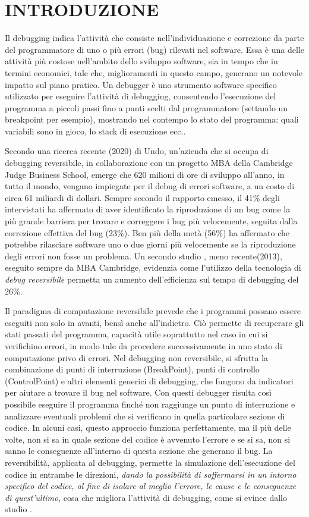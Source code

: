 \documentclass[Tesi.tex]{subfiles}
\begin{document}
\section{INTRODUZIONE}
Il debugging indica l'attività che consiste nell'individuazione e correzione da parte del programmatore di uno o più errori (bug) rilevati nel software.
Essa è una delle attività più costose nell’ambito dello sviluppo software, sia in tempo che in termini economici, tale che, miglioramenti in questo campo, generano un notevole impatto sul piano pratico.
Un debugger è uno strumento software specifico utilizzato per eseguire l'attività di debugging, consentendo l'esecuzione del programma a piccoli passi fino a punti scelti dal programmatore (settando un breakpoint per esempio), mostrando nel contempo lo stato del programma: quali variabili sono in gioco, lo stack di esecuzione ecc..

Secondo una ricerca recente \cite{devops} (2020) di Undo, un'azienda che si occupa di debugging reversibile, in collaborazione con un progetto MBA della Cambridge Judge Business School, emerge che 620 milioni di ore di sviluppo all'anno, in tutto il mondo, vengano impiegate per il debug di errori software, a un costo di circa 61 miliardi di dollari.
Sempre secondo il rapporto emesso, il 41\% degli intervistati ha affermato di aver identificato la riproduzione di un bug come la più grande barriera per trovare e correggere i bug più velocemente, seguita dalla correzione effettiva del bug (23\%). Ben più della metà (56\%) ha affermato che potrebbe rilasciare software uno o due giorni più velocemente se la riproduzione degli errori non fosse un problema. 
Un secondo studio \cite{MBA}, meno recente(2013), eseguito sempre da MBA Cambridge, evidenzia come l’utilizzo della tecnologia di \textit{debug reversibile} permetta un aumento dell'efficienza sul tempo di debugging del 26\%.

Il paradigma di computazione reversibile prevede che i programmi possano essere eseguiti non solo in avanti, bensì anche all'indietro. Ciò permette di recuperare gli stati passati del programma, capacità utile soprattutto nel caso in cui si verifichino errori, in modo tale da procedere successivamente in uno stato di computazione privo di errori.
Nel debugging non reversibile, si sfrutta la combinazione di punti di interruzione (BreakPoint), punti di controllo (ControlPoint) e altri elementi generici di debugging, che fungono da indicatori per aiutare a trovare il bug nel software. Con questi debugger risulta così possibile eseguire il programma finché non raggiunge un punto di interruzione e analizzare eventuali problemi che si verificano in  quella particolare sezione di codice. In alcuni casi, questo approccio funziona perfettamente, ma il più delle volte, non si sa in quale sezione del codice è avvenuto l'errore e se si sa, non si sanno le conseguenze all'interno di questa sezione che generano il bug.
La reversibilità, applicata al debugging, permette la simulazione dell'esecuzione del codice in entrambe le direzioni, \textit{dando la possibilità di soffermarsi in un intorno specifico del codice, al fine di isolare al meglio l'errore, le cause e le conseguenze di quest'ultimo}, cosa che migliora l'attività di debugging, come si evince dallo studio \cite{MBA}.
\end{document}
